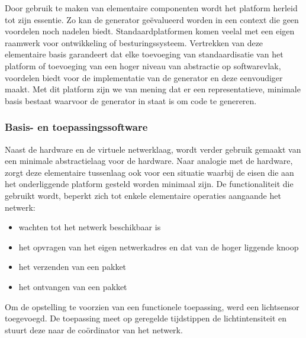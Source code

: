 Door gebruik te maken van elementaire componenten wordt het platform herleid
tot zijn essentie. Zo kan de generator ge\"evalueerd worden in een context die
geen voordelen noch nadelen biedt. Standaardplatformen komen veelal met een
eigen raamwerk voor ontwikkeling of besturingssysteem. Vertrekken van deze
elementaire basis garandeert dat elke toevoeging van standaardisatie van het
platform of toevoeging van een hoger niveau van abstractie op softwarevlak,
voordelen biedt voor de implementatie van de generator en deze eenvoudiger
maakt. Met dit platform zijn we van mening dat er een representatieve, minimale
basis bestaat waarvoor de generator in staat is om code te genereren.

\vspace{-3mm}

\subsubsection{Basis- en toepassingssoftware}
\label{subsection:eval-software}

Naast de hardware en de virtuele netwerklaag, wordt verder gebruik gemaakt van
een minimale abstractielaag voor de hardware. Naar analogie met de hardware,
zorgt deze elementaire tussenlaag ook voor een situatie waarbij de eisen die
aan het onderliggende platform gesteld worden minimaal zijn. De functionaliteit
die gebruikt wordt, beperkt zich tot enkele elementaire operaties aangaande het
netwerk:

\begin{itemize}[noitemsep, topsep=0pt, partopsep=0pt]

  \item wachten tot het netwerk beschikbaar is

  \item het opvragen van het eigen netwerkadres en dat van de hoger liggende
  knoop

  \item het verzenden van een pakket
  
  \item het ontvangen van een pakket

\end{itemize}

Om de opstelling te voorzien van een functionele toepassing, werd een
lichtsensor toegevoegd. De toepassing meet op geregelde tijdstippen de
lichtintensiteit en stuurt deze naar de co\"ordinator van het netwerk.

\vspace{-3mm}


